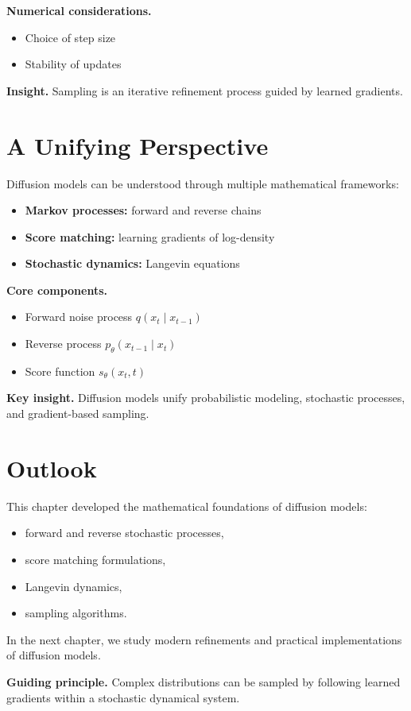 \noindent
\textbf{Numerical considerations.}
\begin{itemize}
    \item Choice of step size
    \item Stability of updates
\end{itemize}

\medskip

\noindent
\textbf{Insight.}  
Sampling is an iterative refinement process guided by learned gradients.

\section{A Unifying Perspective}

Diffusion models can be understood through multiple mathematical frameworks:

\begin{itemize}
    \item \textbf{Markov processes:} forward and reverse chains
    \item \textbf{Score matching:} learning gradients of log-density
    \item \textbf{Stochastic dynamics:} Langevin equations
\end{itemize}

\medskip

\noindent
\textbf{Core components.}
\begin{itemize}
    \item Forward noise process $q(x_t \mid x_{t-1})$
    \item Reverse process $p_\theta(x_{t-1} \mid x_t)$
    \item Score function $s_\theta(x_t, t)$
\end{itemize}

\medskip

\noindent
\textbf{Key insight.}  
Diffusion models unify probabilistic modeling, stochastic processes, and gradient-based sampling.

\section{Outlook}

This chapter developed the mathematical foundations of diffusion models:
\begin{itemize}
    \item forward and reverse stochastic processes,
    \item score matching formulations,
    \item Langevin dynamics,
    \item sampling algorithms.
\end{itemize}

\medskip

In the next chapter, we study modern refinements and practical implementations of diffusion models.

\medskip

\noindent
\textbf{Guiding principle.}  
Complex distributions can be sampled by following learned gradients within a stochastic dynamical system.